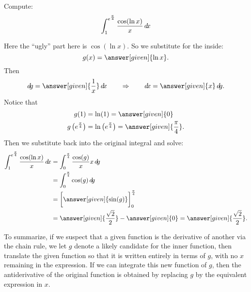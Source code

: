 \documentclass{ximera}
\begin{document}
\begin{example}
  Compute:
  \[
  \int_{1}^{e^{\frac{\pi}{4}}} \frac{\cos(\ln x)}{x} \mathop{}\!d\! x
  \]
\begin{explanation}
Here the ``ugly'' part here is $\cos(\ln x)$.  So we substitute for
the inside:
\[
g(x)=\answer[given]{\ln x}.
\]
Then
\[
\d g =  \answer[given]{\frac{1}{x}} \d x 	\qquad	\Rightarrow	\qquad	\d x = \answer[given]{x} \d g.
\]
Notice that
\begin{align*}
g(1) &= \ln (1) = \answer[given]{0} \\
g \left( e^{\frac{\pi}{4}} \right) &= \ln \left( e^{\frac{\pi}{4}} \right) = \answer[given]{\frac{\pi}{4}}.
\end{align*}
Then we substitute back into the original integral and solve:
\begin{align*}
\int_{1}^{e^{\frac{\pi}{4}}} \frac{\cos(\ln x)}{x} \d x &= \int_0^{\frac{\pi}{4}} \frac{\cos(g)}{x} x \d g  \\
&= \int_0^{\frac{\pi}{4}} \cos(g) \d g  \\
&= \eval{\answer[given]{\sin(g)}}_{0}^{\frac{\pi}{4}}  \\
&= \answer[given]{\frac{\sqrt{2}}{2}} - \answer[given]{0} = \answer[given]{\frac{\sqrt{2}}{2}}.
\end{align*}
\end{explanation}
\end{example}

To summarize, if we suspect that a given function is the derivative of
another via the chain rule, we let $g$ denote a likely candidate for
the inner function, then translate the given function so that it is
written entirely in terms of $g$, with no $x$ remaining in the
expression. If we can integrate this new function of $g$, then the
antiderivative of the original function is obtained by replacing $g$
by the equivalent expression in $x$.
\end{document}
